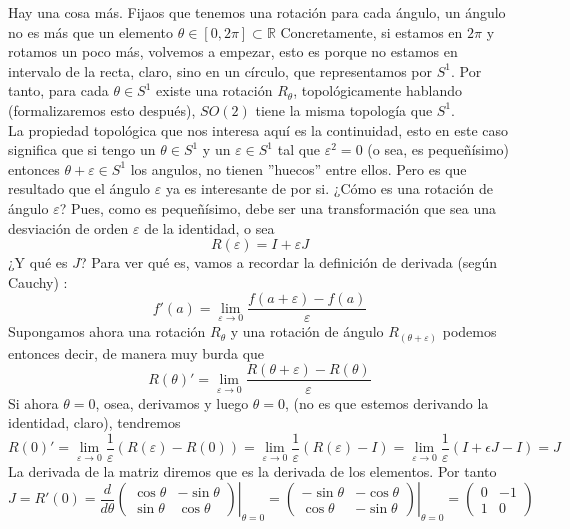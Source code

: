 \documentclass[12pt]{article}
\begin{document}
Hay una cosa más. Fijaos que tenemos una rotación para cada ángulo, un ángulo no es más que un elemento $\theta \in [0,2\pi] \subset \mathbb{R}$ Concretamente, si estamos en $2\pi$ y rotamos un poco más, volvemos a empezar, esto es porque no estamos en intervalo de la recta, claro, sino en un círculo, que representamos por $S^1$. Por tanto, para cada $\theta \in S^1$ existe una rotación $R_\theta$, topológicamente hablando (formalizaremos esto después), $SO(2)$ tiene la misma topología que $S^1$. \\ La propiedad topológica que nos interesa aquí es la continuidad, esto en este caso significa que si tengo un $\theta \in S^1$ y un $\varepsilon\in S^1$ tal que $\varepsilon^2=0$ (o sea, es pequeñísimo) entonces $\theta +\varepsilon \in S^1$ los angulos, no tienen ''huecos'' entre ellos. Pero es que resultado que el ángulo $\varepsilon$ ya es interesante de por si. ¿Cómo es una rotación de ángulo $\varepsilon$? Pues, como es pequeñísimo, debe ser una transformación que sea una desviación de orden $\varepsilon$ de la identidad, o sea 
\begin{equation*}
    R(\varepsilon)= I +\varepsilon J
\end{equation*}
¿Y qué es $J$? Para ver qué es, vamos a recordar la definición de derivada (según Cauchy) :
\begin{equation*}
    f'(a)=\lim_{\varepsilon\rightarrow 0}\frac{f(a+\varepsilon)-f(a)}{\varepsilon}
\end{equation*}
Supongamos ahora una rotación $R_\theta$ y una rotación de ángulo $R_{(\theta+\varepsilon)}$ podemos entonces decir, de manera muy burda que 
\begin{equation*}
    R(\theta)' =  \lim_{\varepsilon\rightarrow 0}\frac{R(\theta+\varepsilon)-R(\theta)}{\varepsilon}
\end{equation*}
Si ahora $\theta =0$, osea, derivamos y luego $\theta =0$, (no es que estemos derivando la identidad, claro), tendremos 
\begin{equation*}
    R(0)' =   \lim_{\varepsilon\rightarrow 0}\frac{1}{\varepsilon}(R(\varepsilon)-R(0)) =\lim_{\varepsilon\rightarrow 0}\frac{1}{\varepsilon}(R(\varepsilon)-I)=\lim_{\varepsilon\rightarrow 0}\frac{1}{\varepsilon}(I+\epsilon J-I) =J 
\end{equation*}
La derivada de la matriz diremos que es la derivada de los elementos. Por tanto
\begin{equation*}
    J=R' (0) = \left. \frac{d}{d\theta}\begin{pmatrix}
        \cos \theta & -\sin\theta \\ \sin\theta & \cos\theta 
    \end{pmatrix}\right|_{\theta =0 } =\left. \begin{pmatrix}
        -\sin\theta & -\cos \theta \\ \cos \theta &-\sin\theta 
    \end{pmatrix} \right|_{\theta=0} =\begin{pmatrix}
        0 & -1 \\ 1 & 0
    \end{pmatrix}
\end{equation*}
\end{document}
